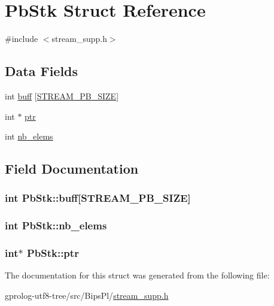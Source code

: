 \hypertarget{structPbStk}{}\section{Pb\+Stk Struct Reference}
\label{structPbStk}


{\ttfamily \#include $<$stream\+\_\+supp.\+h$>$}

\subsection*{Data Fields}
\begin{DoxyCompactItemize}
\item 
int \hyperlink{structPbStk_a753c451400807eac788034c15a4e9810}{buff} \mbox{[}\hyperlink{stream__supp_8h_a7c01809509d811cfc0c70e47443a9613}{S\+T\+R\+E\+A\+M\+\_\+\+P\+B\+\_\+\+S\+I\+ZE}\mbox{]}
\item 
int $\ast$ \hyperlink{structPbStk_a739af7eef937b961dc73fec61672bee2}{ptr}
\item 
int \hyperlink{structPbStk_a222a0c77b4b0feef1323dc7cf1f0e74b}{nb\+\_\+elems}
\end{DoxyCompactItemize}


\subsection{Field Documentation}
\subsubsection[{\texorpdfstring{buff}{buff}}]{\setlength{\rightskip}{0pt plus 5cm}int Pb\+Stk\+::buff\mbox{[}{\bf S\+T\+R\+E\+A\+M\+\_\+\+P\+B\+\_\+\+S\+I\+ZE}\mbox{]}}\hypertarget{structPbStk_a753c451400807eac788034c15a4e9810}{}\label{structPbStk_a753c451400807eac788034c15a4e9810}
\subsubsection[{\texorpdfstring{nb\+\_\+elems}{nb_elems}}]{\setlength{\rightskip}{0pt plus 5cm}int Pb\+Stk\+::nb\+\_\+elems}\hypertarget{structPbStk_a222a0c77b4b0feef1323dc7cf1f0e74b}{}\label{structPbStk_a222a0c77b4b0feef1323dc7cf1f0e74b}
\subsubsection[{\texorpdfstring{ptr}{ptr}}]{\setlength{\rightskip}{0pt plus 5cm}int$\ast$ Pb\+Stk\+::ptr}\hypertarget{structPbStk_a739af7eef937b961dc73fec61672bee2}{}\label{structPbStk_a739af7eef937b961dc73fec61672bee2}


The documentation for this struct was generated from the following file\+:\begin{DoxyCompactItemize}
\item 
gprolog-\/utf8-\/tree/src/\+Bips\+Pl/\hyperlink{stream__supp_8h}{stream\+\_\+supp.\+h}\end{DoxyCompactItemize}
